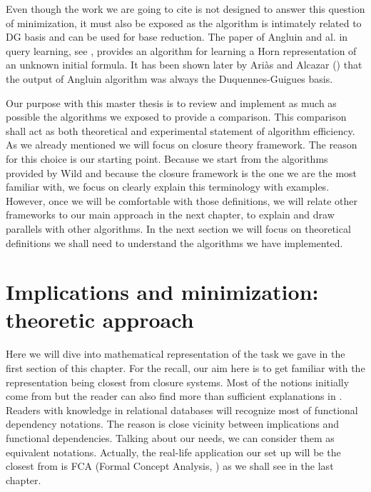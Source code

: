 \vspace{1.2em}

Even though the work we are going to cite is not designed to answer this 
question of minimization, it must also be exposed as the algorithm is 
intimately related to DG basis and can be used for base reduction. The paper
of Angluin and al. in query learning, see \cite{angluin_learning_1992}, provides
an algorithm for learning a Horn representation of an unknown initial formula. 
It has been shown later by Ariàs and Alcazar (\cite{arias_canonical_2009}) that
the output of Angluin algorithm was always the Duquennes-Guigues basis.

\vspace{1.2em}

Our purpose with this master thesis is to review and implement as much as 
possible the algorithms we exposed to provide a comparison. This comparison 
shall act as both theoretical and experimental statement of algorithm 
efficiency. As we already mentioned we will focus on closure theory framework.
The reason for this choice is our starting point. Because we start from the
algorithms provided by Wild and because the closure framework is the one we 
are the most familiar with, we focus on clearly explain this terminology with
examples. However, once we will be comfortable with those definitions, we will 
relate other frameworks to our main approach in the next chapter, to explain and
draw parallels with other algorithms. In the next section we will focus on 
theoretical definitions we shall need to understand the algorithms we have 
implemented.



\section{Implications and minimization: theoretic approach}

Here we will dive into mathematical representation of the task we gave
in the first section of this chapter. For the recall, our aim here is to
get familiar with the representation being closest from closure systems.  Most 
of the notions initially come from \cite{guigues_j.l_familles_1986, 
ganter_two_2010, wild_theory_1994,	ganter_formal_1999} but the reader can 
also find more than sufficient explanations in \cite{b._ganter_conceptual_2016, 
wild_joy_2017}. Readers with knowledge in relational databases will recognize 
most of functional dependency notations. The reason is close vicinity between 
implications and functional dependencies. Talking about our needs, we can 
consider them as equivalent notations. Actually, the real-life application our 
set up will be the closest from is FCA (Formal Concept Analysis, \cite{ganter_formal_1999}) as we shall see in the last chapter.


